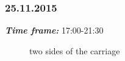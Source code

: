 \subsubsection{25.11.2015}
\textit{\textbf{Time frame:}} 17:00-21:30 \newline


\begin{figure}[H]
	\begin{minipage}[h]{1\linewidth}
		\caption{two sides of the carriage}
	\end{minipage}
\end{figure}

